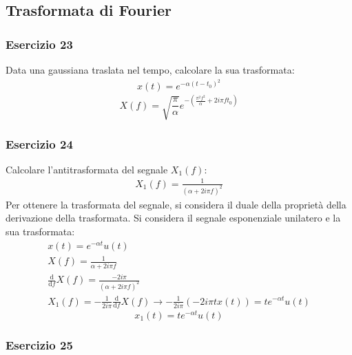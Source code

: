 \documentclass{article}
\newcommand{\df}{\mathrm{d}}
\begin{document}
\subsection{Trasformata di Fourier}

\subsubsection*{Esercizio 23}

Data una gaussiana traslata nel tempo, calcolare la sua trasformata: 
\begin{gather*}
    x(t)=e^{-\alpha(t-t_0)^2}
\end{gather*}
\begin{equation}
    X(f)=\displaystyle\sqrt{\frac{\pi}{\alpha}}e^{-\left(\frac{\pi^2f^2}{\alpha}+2i\pi ft_0\right)}
\end{equation}

\subsubsection*{Esercizio 24}

Calcolare l'antitrasformata del segnale $X_1(f)$: 
\begin{gather*}
    X_1(f)=\displaystyle\frac{1}{(\alpha+2i\pi f)^2}
\end{gather*}
Per ottenere la trasformata del segnale, si considera il duale della proprietà della derivazione della trasformata. Si considera il segnale esponenziale unilatero e la sua 
trasformata:
\begin{gather*}
    x(t)=e^{-\alpha t}u(t)\\
    X(f)=\displaystyle\frac{1}{\alpha+2i\pi f}\\
    \displaystyle\frac{\df}{\df f}X(f)=\frac{-2i\pi}{(\alpha+2i\pi f)^2}\\
    X_1(f)=\displaystyle-\frac{1}{2i\pi}\frac{\df}{\df f}X(f)\to-\frac{1}{2i\pi}(-2i\pi tx(t))=te^{-\alpha t}u(t)
\end{gather*}
\begin{equation}
    x_1(t)=te^{-\alpha t}u(t)
\end{equation}

\subsubsection*{Esercizio 25}
\end{document}
